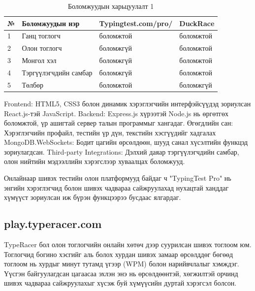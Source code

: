 \begin{table}[h]
	\caption{Боломжуудын харьцуулалт 1}
	\begin{tabular}{|l|l|l|p{8cm}|}
		\hline
		№ & Боломжуудын нэр       & Typingtest.com/pro/ & DuckRace  \\ \hline
		1 & Ганц тоглогч          & боломжтой           & боломжтой \\ \hline
		2 & Олон тоглогч          & боломжгүй           & боломжтой \\ \hline
		3 & Монгол хэл            & боломжгүй           & боломжтой \\ \hline
		4 & Тэргүүлэгчдийн самбар & боломжгүй           & боломжтой \\ \hline
		5 & Төлбөр                & боломжтой           & боломжгүй \\ \hline
	\end{tabular}
\end{table}

Frontend: HTML5, CSS3 болон динамик хэрэглэгчийн интерфэйсүүдэд зориулсан React.js-тэй JavaScript.
Backend: Express.js хүрээтэй Node.js нь өргөтгөх боломжтой, үр ашигтай сервер талын программыг хангадаг.
Өгөгдлийн сан: Хэрэглэгчийн профайл, тестийн үр дүн, текстийн хэсгүүдийг хадгалах MongoDB.WebSockets: Бодит цагийн өрсөлдөөн, шууд санал хүсэлтийн функцэд зориулагдсан.
Third-party Integrations: Дэлхий даяар тэргүүлэгчдийн самбар, олон нийтийн мэдээллийн хэрэгслээр хуваалцах боломжууд.

Онлайнаар шивэх тестийн олон платформууд байдаг ч "TypingTest Pro" нь энгийн хэрэглэгчид болон шивэх чадвараа сайжруулахад нухацтай ханддаг хүмүүст зориулсан иж бүрэн функцээрээ бусдаас ялгардаг.

\subsection{play.typeracer.com}

TypeRacer бол олон тоглогчийн онлайн хөтөч дээр суурилсан шивэх тоглоом юм. Тоглогчид богино хэсгийг аль болох хурдан шивэх замаар өрсөлддөг бөгөөд тоглоом нь хурдыг минут тутамд үгээр (WPM) болон нарийвчлалыг хэмждэг. Үүсгэн байгуулагдсан цагаасаа эхлэн энэ нь өрсөлдөөнтэй, хөгжилтэй орчинд шивэх чадвараа сайжруулахыг хүсэж буй хүмүүсийн дуртай хэрэгсэл болсон.

